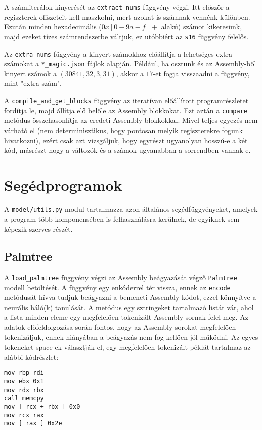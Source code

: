 A számliterálok kinyerését az \texttt{extract\_nums} függvény végzi. Itt először a regiszterek offszeteit kell
maszkolni, mert azokat is számnak vennénk különben. Ezután minden hexadecimális ($0x[0-9a-f]+$ alakú) számot
kikeresünk, majd ezeket tízes számrendszerbe váltjuk, ez utóbbiért az \texttt{s16} függvény felelős.

Az \texttt{extra\_nums} függvény a kinyert számokhoz előállítja a lehetséges extra számokat a \texttt{*\_magic.json}
fájlok alapján. Például, ha osztunk és az Assembly-ből kinyert számok a $(30841, 32, 3, 31)$, akkor a $17$-et fogja
visszaadni a függvény, mint "extra szám".

A \texttt{compile\_and\_get\_blocks} függvény az iteratívan előállított programrészletet fordítja le, majd állítja
elő belőle az Assembly blokkokat. Ezt aztán a \texttt{compare} metódus összehasonlítja az eredeti Assembly blokkokkal.
Mivel teljes egyezés nem várható el (nem determinisztikus, hogy pontosan melyik regiszterekre fogunk hivatkozni),
ezért csak azt vizsgáljuk, hogy egyrészt ugyanolyan hosszú-e a két kód, másrészt hogy a változók és a számok
ugyanabban a sorrendben vannak-e.


\section{Segédprogramok}

A \texttt{model/utils.py} modul tartalmazza azon általános segédfüggvényeket, amelyek a program
több komponensében is felhasználásra kerülnek, de egyiknek sem képezik szerves részét.

\subsection{Palmtree}
A \texttt{load\_palmtree} függvény végzi az Assembly beágyazását végző \texttt{Palmtree} modell betöltését.
A függvény egy enkóderrel tér vissza, ennek az \texttt{encode} metódusát hívva tudjuk beágyazni a bemeneti
Assembly kódot, ezzel könnyítve a neurális háló(k) tanulását. A metódus egy sztringeket tartalmazó listát vár,
ahol a lista minden eleme egy megfelelően tokenizált Assembly sornak felel meg. Az adatok előfeldolgozása
során fontos, hogy az Assembly sorokat megfelelően tokenizáljuk, ennek hiányában a beágyazás nem fog kellően
jól működni. Az egyes tokeneket space-ek választják el, egy megfelelően tokenizált példát tartalmaz az alábbi
kódrészlet:

\begin{lstlisting}[language={[x86masm]Assembler}]
mov rbp rdi
mov ebx 0x1
mov rdx rbx
call memcpy
mov [ rcx + rbx ] 0x0
mov rcx rax
mov [ rax ] 0x2e
\end{lstlisting}

